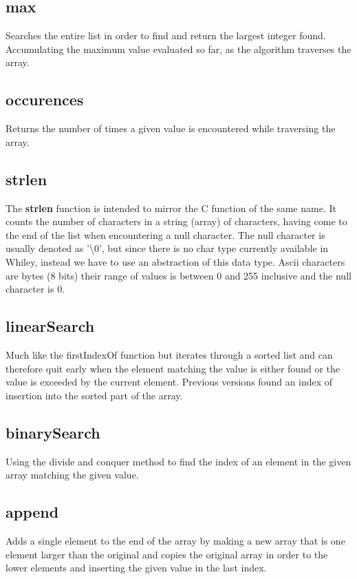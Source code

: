 \documentclass[10pt]{article} %
\begin{document}
\subsection{max}
Searches the entire list in order to find and return the largest integer found. Accumulating the maximum value evaluated so far, as the algorithm traverses the array. 

\subsection{occurences}
Returns the number of times a given value is encountered while traversing the array.

\subsection{strlen}
The \textbf{strlen} function is intended to mirror the C function of the same name. It counts the number of characters in a string (array) of characters, having come to the end of the list when encountering a null character. The null character is usually denoted as '\textbackslash0', but since there is no char type currently available in Whiley, instead we have to use an abstraction of this data type. Ascii characters are bytes (8 bits) their range of values is between 0 and 255 inclusive and the null character is 0.

\subsection{linearSearch}
Much like the firstIndexOf function but iterates through a sorted list and can therefore quit early when the element matching the value is either found or the value is exceeded by the current element. Previous versions found an index of insertion into the sorted part of the array.

\subsection{binarySearch}
Using the divide and conquer method to find the index of an element in the given array matching the given value.

\subsection{append}
Adds a single element to the end of the array by making a new array that is one element larger than the original and copies the original array in order to the lower elements and inserting the given value in the last index.
\end{document}
